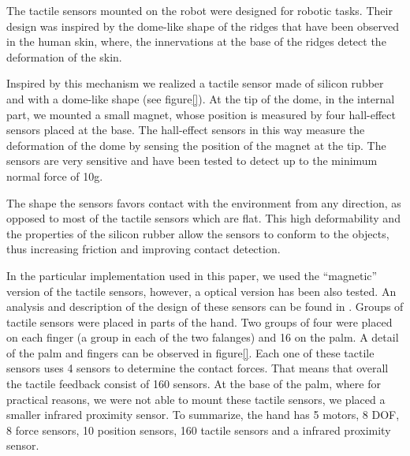 
The tactile sensors mounted on the robot were designed for robotic tasks. 
Their design was inspired by the dome-like shape of the ridges that have been 
observed in the human skin, where, the innervations at the base of the ridges 
detect the deformation of the skin. 

Inspired by this mechanism we realized a tactile sensor made of silicon rubber 
and with a dome-like shape (see figure\ref{}). At the tip of the dome, in the 
internal part, we mounted a small magnet, whose position is measured by four 
hall-effect sensors placed at the base. The hall-effect sensors in this way 
measure the deformation of the dome by sensing the position of the magnet at the 
tip. The sensors are very sensitive and have been tested to detect up to the 
minimum normal force of 10g. 

The shape the sensors favors contact with the environment from any direction, 
as opposed to most of the tactile sensors which are flat. 
This high deformability and the properties of the silicon rubber allow the 
sensors to conform to the objects, thus increasing friction and improving 
contact detection. 

In the particular implementation used in this paper, we used the ``magnetic'' 
version of the tactile sensors, however, a optical version has been also tested. 
An analysis and description of the design of these sensors can be
found in \cite{etorresjSoft}. Groups of tactile sensors were
placed in parts of the hand. Two groups of four
were placed on each finger (a group in each of the two falanges)
and 16 on the palm. A detail of the palm and fingers can be
observed in figure\ref{}. Each one of these tactile sensors uses 4
sensors to determine the contact forces. That means that overall the 
tactile feedback consist of 160 sensors. At the base of the
palm, where for practical reasons, we were not able to mount 
these tactile sensors, we placed a smaller infrared proximity sensor. 
To summarize, the hand has 5 motors, 8 DOF, 8 force sensors, 10 position
sensors, 160 tactile sensors and a infrared proximity sensor.

